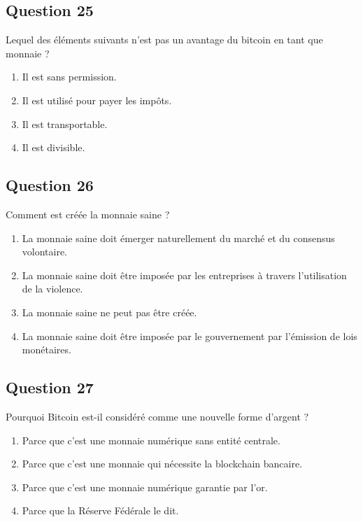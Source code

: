 \documentclass[12pt,a4paper]{article}
\begin{document}
\bigskip


\subsection*{Question 25}
Lequel des éléments suivants n'est pas un avantage du bitcoin en tant que monnaie ?

\begin{enumerate}[label=\Alph*., leftmargin=*]
\item Il est sans permission.
\item Il est utilisé pour payer les impôts.
\item Il est transportable.
\item Il est divisible.
\end{enumerate}

\bigskip


\subsection*{Question 26}
Comment est créée la monnaie saine ?

\begin{enumerate}[label=\Alph*., leftmargin=*]
\item La monnaie saine doit émerger naturellement du marché et du consensus volontaire.
\item La monnaie saine doit être imposée par les entreprises à travers l'utilisation de la violence.
\item La monnaie saine ne peut pas être créée.
\item La monnaie saine doit être imposée par le gouvernement par l'émission de lois monétaires.
\end{enumerate}

\bigskip


\subsection*{Question 27}
Pourquoi Bitcoin est-il considéré comme une nouvelle forme d'argent ?

\begin{enumerate}[label=\Alph*., leftmargin=*]
\item Parce que c'est une monnaie numérique sans entité centrale.
\item Parce que c'est une monnaie qui nécessite la blockchain bancaire.
\item Parce que c'est une monnaie numérique garantie par l'or.
\item Parce que la Réserve Fédérale le dit.
\end{enumerate}
\end{document}
